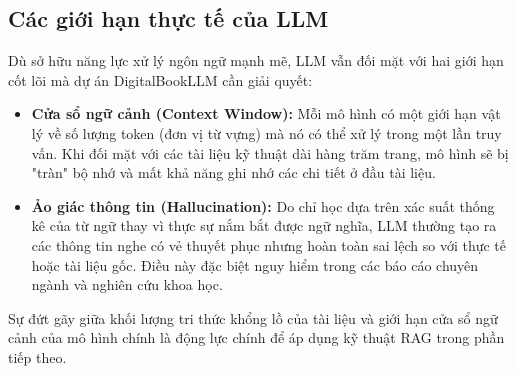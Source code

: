 \subsection{Các giới hạn thực tế của LLM}
Dù sở hữu năng lực xử lý ngôn ngữ mạnh mẽ, LLM vẫn đối mặt với hai giới hạn cốt lõi mà dự án DigitalBookLLM cần giải quyết:

\begin{itemize}
    \item \textbf{Cửa sổ ngữ cảnh (Context Window):} Mỗi mô hình có một giới hạn vật lý về số lượng token (đơn vị từ vựng) mà nó có thể xử lý trong một lần truy vấn. Khi đối mặt với các tài liệu kỹ thuật dài hàng trăm trang, mô hình sẽ bị "tràn" bộ nhớ và mất khả năng ghi nhớ các chi tiết ở đầu tài liệu.
    \item \textbf{Ảo giác thông tin (Hallucination):} Do chỉ học dựa trên xác suất thống kê của từ ngữ thay vì thực sự nắm bắt được ngữ nghĩa, LLM thường tạo ra các thông tin nghe có vẻ thuyết phục nhưng hoàn toàn sai lệch so với thực tế hoặc tài liệu gốc. Điều này đặc biệt nguy hiểm trong các báo cáo chuyên ngành và nghiên cứu khoa học.
\end{itemize}

Sự đứt gãy giữa khối lượng tri thức khổng lồ của tài liệu và giới hạn cửa sổ ngữ cảnh của mô hình chính là động lực chính để áp dụng kỹ thuật RAG trong phần tiếp theo. \cite{lewis2020retrieval,gao2023retrieval}